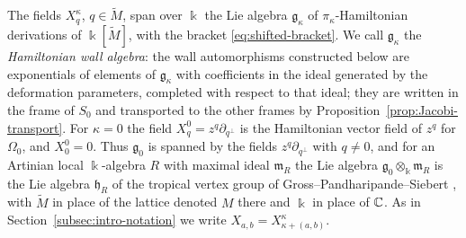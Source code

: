 The fields $X^\kappa_q$, $q\in\widetilde M$, span over $\Bbbk$ the Lie
algebra $\mathfrak g_\kappa$ of $\pi_\kappa$-Hamiltonian derivations of
$\Bbbk[\widetilde M]$, with the bracket \eqref{eq:shifted-bracket}.  We call
$\mathfrak g_\kappa$ the \emph{Hamiltonian wall algebra}: the wall
automorphisms constructed below are exponentials of elements of
$\mathfrak g_\kappa$ with coefficients in the ideal generated by the
deformation parameters, completed with respect to that ideal; they are
written in the frame of $S_0$ and transported to the other frames by
Proposition~\ref{prop:Jacobi-transport}.  For $\kappa=0$ the field
$X^0_q=z^q\partial_{q^\perp}$ is the Hamiltonian vector field of $z^q$ for
$\Omega_0$, and $X^0_0=0$.  Thus $\mathfrak g_0$ is spanned by the fields
$z^q\partial_{q^\perp}$ with $q\neq0$, and for an Artinian local
$\Bbbk$-algebra $R$ with maximal ideal $\mathfrak m_R$ the Lie algebra
$\mathfrak g_0\otimes_\Bbbk\mathfrak m_R$ is the Lie algebra
$\mathfrak h_R$ of the tropical vertex group of
Gross--Pandharipande--Siebert \cite[Sect.~1.1]{grosspandharipandesiebert2010},
with $\widetilde M$ in place of the lattice denoted $M$ there and $\Bbbk$ in
place of $\mathbb C$.  As in
Section~\ref{subsec:intro-notation} we write
$X_{a,b}=X^\kappa_{\kappa+(a,b)}$.

